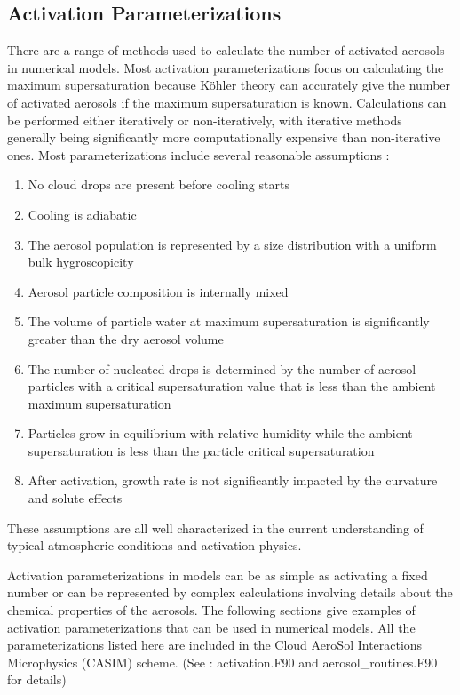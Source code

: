 \subsection{Activation Parameterizations}
There are a range of methods used to calculate the number of activated aerosols in numerical models. Most activation parameterizations focus on calculating the maximum supersaturation because K\"ohler theory can accurately give the number of activated aerosols if the maximum supersaturation is known. Calculations can be performed either iteratively or non-iteratively, with iterative methods generally being significantly more computationally expensive than non-iterative ones. Most parameterizations include several reasonable assumptions \citep{Ghan2011}:
\begin{enumerate}
	\item{No cloud drops are present before cooling starts}
	\item{Cooling is adiabatic}
	\item{The aerosol population is represented by a size distribution with a uniform bulk hygroscopicity}
	\item{Aerosol particle composition is internally mixed}
	\item{The volume of particle water at maximum supersaturation is significantly greater than the dry aerosol volume}
	\item{The number of nucleated drops is determined by the number of aerosol particles with a critical supersaturation value that is less than the ambient maximum supersaturation}
	\item{Particles grow in equilibrium with relative humidity while the ambient supersaturation is less than the particle critical supersaturation}
	\item{After activation, growth rate is not significantly impacted by the curvature and solute effects}
\end{enumerate}

These assumptions are all well characterized in the current understanding of typical atmospheric conditions and activation physics.

Activation parameterizations in models can be as simple as activating a fixed number or can be represented by complex calculations involving details about the chemical properties of the aerosols. The following sections give examples of activation parameterizations that can be used in numerical models. All the parameterizations listed here are included in the Cloud AeroSol Interactions Microphysics (CASIM) scheme. (See \cite{casimCode}: activation.F90 and aerosol\_routines.F90 for details)

